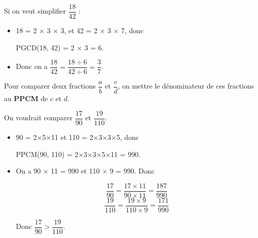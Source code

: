\documentclass[a4paper,11pt]{article}
\begin{document}
\begin{exemple}
	Si on veut simplifier $\dfrac{18}{42}$ :
	\begin{itemize}
		\item 18 = 2 × 3 × 3, et 42 = 2 × 3 × 7, donc

		      PGCD(18, 42) = 2 × 3 = 6.
		\item Donc on a $\dfrac{18}{42} = \dfrac{18 ÷ 6}{42 ÷ 6} = \dfrac{3}{7}$.
	\end{itemize}
\end{exemple}

\begin{methode}
	Pour comparer deux fractions $\dfrac{a}{b}$ et $\dfrac{c}{d}$, on mettre le dénominateur de ces fractions au \textbf{PPCM} de $c$ et $d$.
\end{methode}

\begin{exemple}
	On voudrait comparer $\dfrac{17}{90}$ et $\dfrac{19}{110}$.
	\begin{itemize}
		\item 90 = 2×5×11 et 110 = 2×3×3×5, donc

		      PPCM(90, 110) = 2×3×3×5×11 = 990.
		\item On a 90 × 11 = 990 et 110 × 9 = 990. Donc

		      $$ \dfrac{17}{90} = \dfrac{17 × 11}{90 × 11} = \dfrac{187}{990} $$
		      $$ \dfrac{19}{110} = \dfrac{19 × 9}{110 × 9} = \dfrac{171}{990} $$

		      Donc $\dfrac{17}{90} > \dfrac{19}{110}$.
	\end{itemize}
\end{exemple}
\end{document}
